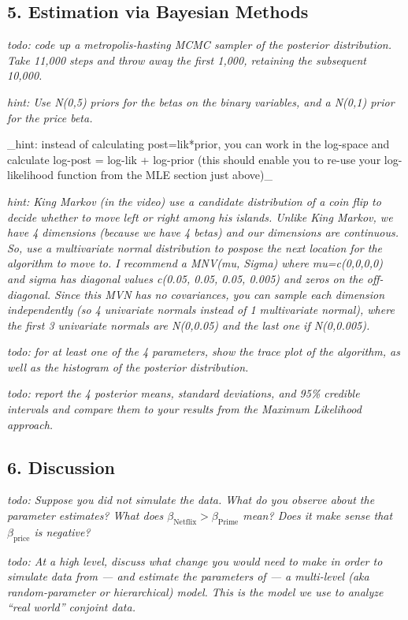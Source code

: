 \documentclass[
  letterpaper,
  DIV=11,
  numbers=noendperiod]{scrartcl}
\begin{document}
\subsection{5. Estimation via Bayesian
Methods}\label{estimation-via-bayesian-methods}

\emph{todo: code up a metropolis-hasting MCMC sampler of the posterior
distribution. Take 11,000 steps and throw away the first 1,000,
retaining the subsequent 10,000.}

\emph{hint: Use N(0,5) priors for the betas on the binary variables, and
a N(0,1) prior for the price beta.}

\_hint: instead of calculating post=lik*prior, you can work in the
log-space and calculate log-post = log-lik + log-prior (this should
enable you to re-use your log-likelihood function from the MLE section
just above)\_

\emph{hint: King Markov (in the video) use a candidate distribution of a
coin flip to decide whether to move left or right among his islands.
Unlike King Markov, we have 4 dimensions (because we have 4 betas) and
our dimensions are continuous. So, use a multivariate normal
distribution to pospose the next location for the algorithm to move to.
I recommend a MNV(mu, Sigma) where mu=c(0,0,0,0) and sigma has diagonal
values c(0.05, 0.05, 0.05, 0.005) and zeros on the off-diagonal. Since
this MVN has no covariances, you can sample each dimension independently
(so 4 univariate normals instead of 1 multivariate normal), where the
first 3 univariate normals are N(0,0.05) and the last one if
N(0,0.005).}

\emph{todo: for at least one of the 4 parameters, show the trace plot of
the algorithm, as well as the histogram of the posterior distribution.}

\emph{todo: report the 4 posterior means, standard deviations, and 95\%
credible intervals and compare them to your results from the Maximum
Likelihood approach.}

\subsection{6. Discussion}\label{discussion}

\emph{todo: Suppose you did not simulate the data. What do you observe
about the parameter estimates? What does
\(\beta_\text{Netflix} > \beta_\text{Prime}\) mean? Does it make sense
that \(\beta_\text{price}\) is negative?}

\emph{todo: At a high level, discuss what change you would need to make
in order to simulate data from --- and estimate the parameters of --- a
multi-level (aka random-parameter or hierarchical) model. This is the
model we use to analyze ``real world'' conjoint data.}
\end{document}
